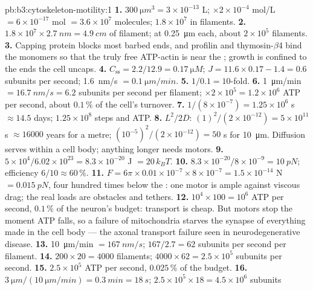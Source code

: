 \begin{solution}{pb:b3:cytoskeleton-motility:1}
\textbf{1.} $\qty{300}{\micro m^3} = 3\times 10^{-13}$ L; $\times
2\times 10^{-4}$ mol/L $= 6\times 10^{-17}$ mol $= 3.6\times 10^{7}$
molecules; $1.8\times 10^{7}$ in filaments.
\textbf{2.} $1.8\times 10^{7}\times \qty{2.7}{nm} = \qty{4.9}{cm}$ of
filament; at \qty{0.25}{\micro m} each, about $2\times 10^{5}$
filaments.
\textbf{3.} Capping protein blocks most barbed ends, and profilin and
thymosin-$\beta$4 bind the monomers so that the truly free ATP-actin is
near the ; growth is confined to the ends the
cell uncaps.
\textbf{4.} $C_{\text{ss}} = 2.2/12.9 = \qty{0.17}{\micro M}$; $J = 11.6
\times 0.17 - 1.4 = 0.6$ subunits per second; \qty{1.6}{nm/s} $=
\qty{0.1}{\micro m/min}$.
\textbf{5.} $1/0.1 = 10$-fold.
\textbf{6.} \qty{1}{\micro m/min} $= \qty{16.7}{nm/s} = 6.2$ subunits per
second per filament; $\times 2\times 10^{5} = 1.2\times 10^{6}$ ATP per
second, about $0.1\,\%$ of the cell's turnover.
\textbf{7.} $1/(8\times 10^{-7}) = 1.25\times 10^{6}$ s $\approx 14.5$
days; $1.25\times 10^{8}$ steps and ATP.
\textbf{8.} $L^{2}/2D$: $(1)^{2}/(2\times 10^{-12}) = 5\times 10^{11}$ s
$\approx \num{16000}$ years for a metre; $(10^{-5})^{2}/(2\times
10^{-12}) = 50$ s for \qty{10}{\micro m}. Diffusion serves within a
cell body; anything longer needs motors.
\textbf{9.} $5\times 10^{4}/6.02\times 10^{23} = 8.3\times 10^{-20}$ J
$= 20\,k_{B}T$.
\textbf{10.} $8.3\times 10^{-20}/8\times 10^{-9} = \qty{10}{pN}$;
efficiency $6/10 \approx 60\,\%$.
\textbf{11.} $F = 6\pi\times 0.01\times 10^{-7}\times 8\times 10^{-7} =
1.5\times 10^{-14}$ N $= \qty{0.015}{pN}$, four hundred times below
the : one motor is ample against viscous drag; the real
loads are obstacles and tethers.
\textbf{12.} $10^{4}\times 100 = 10^{6}$ ATP per second, $0.1\,\%$ of the
neuron's budget: transport is cheap. But motors stop the moment ATP
falls, so a failure of mitochondria starves the synapse of everything
made in the cell body --- the axonal transport failure seen in
neurodegenerative disease.
\textbf{13.} \qty{10}{\micro m/min} $= \qty{167}{nm/s}$; $167/2.7 = 62$
subunits per second per filament.
\textbf{14.} $200\times 20 = 4000$ filaments; $4000\times 62 = 2.5\times
10^{5}$ subunits per second.
\textbf{15.} $2.5\times 10^{5}$ ATP per second, $0.025\,\%$ of the
budget.
\textbf{16.} $\qty{3}{\micro m}/(\qty{10}{\micro m/min}) = \qty{0.3}{min}
= \qty{18}{s}$; $2.5\times 10^{5}\times 18 = 4.5\times 10^{6}$ subunits

\end{solution}
